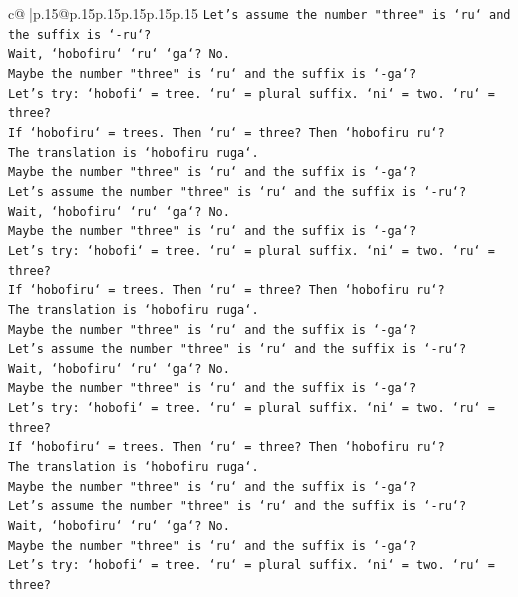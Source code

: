\documentclass{article}
\begin{document}
{\begin{supertabular}{c@{$\;$}|p{.15\linewidth}@{}p{.15\linewidth}p{.15\linewidth}p{.15\linewidth}p{.15\linewidth}p{.15\linewidth}}
{{{\texttt{Let's assume the number "three" is `ru` and the suffix is `{-}ru`?} \\
\texttt{Wait, `hobofiru` `ru` `ga`? No.} \\
\texttt{Maybe the number "three" is `ru` and the suffix is `{-}ga`?} \\
\texttt{Let's try: `hobofi` = tree. `ru` = plural suffix. `ni` = two. `ru` = three?} \\
\texttt{If `hobofiru` = trees. Then `ru` = three? Then `hobofiru ru`?} \\
\texttt{The translation is `hobofiru ruga`.} \\
\texttt{Maybe the number "three" is `ru` and the suffix is `{-}ga`?} \\
\texttt{Let's assume the number "three" is `ru` and the suffix is `{-}ru`?} \\
\texttt{Wait, `hobofiru` `ru` `ga`? No.} \\
\texttt{Maybe the number "three" is `ru` and the suffix is `{-}ga`?} \\
\texttt{Let's try: `hobofi` = tree. `ru` = plural suffix. `ni` = two. `ru` = three?} \\
\texttt{If `hobofiru` = trees. Then `ru` = three? Then `hobofiru ru`?} \\
\texttt{The translation is `hobofiru ruga`.} \\
\texttt{Maybe the number "three" is `ru` and the suffix is `{-}ga`?} \\
\texttt{Let's assume the number "three" is `ru` and the suffix is `{-}ru`?} \\
\texttt{Wait, `hobofiru` `ru` `ga`? No.} \\
\texttt{Maybe the number "three" is `ru` and the suffix is `{-}ga`?} \\
\texttt{Let's try: `hobofi` = tree. `ru` = plural suffix. `ni` = two. `ru` = three?} \\
\texttt{If `hobofiru` = trees. Then `ru` = three? Then `hobofiru ru`?} \\
\texttt{The translation is `hobofiru ruga`.} \\
\texttt{Maybe the number "three" is `ru` and the suffix is `{-}ga`?} \\
\texttt{Let's assume the number "three" is `ru` and the suffix is `{-}ru`?} \\
\texttt{Wait, `hobofiru` `ru` `ga`? No.} \\
\texttt{Maybe the number "three" is `ru` and the suffix is `{-}ga`?} \\
\texttt{Let's try: `hobofi` = tree. `ru` = plural suffix. `ni` = two. `ru` = three?} \\
}}}
\end{supertabular}}
\end{document}
